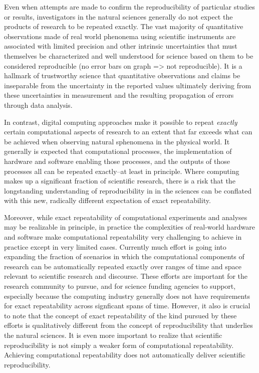 Even when attempts are made to confirm the reproducibility of particular studies or results, investigators in
	the natural sciences generally do not expect the products of research to be repeated exactly.
The vast majority of quantitative observations made of real world phenonema using scientific instruments
	are associated with limited precision and other intrinsic uncertainties that must themselves be characterized
	and well understood for science based on them to be considered reproducible (no error bars on graph => not
	reproducible).
It is a hallmark of trustworthy science that quantitative observations and claims be inseparable from the uncertainty
	in the reported values ultimately deriving from these uncertainties in measurement and the resulting
	propagation of errors through data analysis.

In contrast, digital computing approaches make it possible to repeat \emph{exactly} certain computational aspects of research
	to an extent that far exceeds what can be achieved when observing natural sphenomena in the physical world.  
It generally is expected that computational processes, the implementation of hardware and software 
	enabling those processes, and the outputs of those processes all can be repeated exactly--at least in principle.
Where computing makes up a significant fraction of scientific research, there is a risk that the longstanding
	understanding of reproducibility in in the sciences can be conflated with this new, radically different 
	expectation of exact repeatability. 

Moreover, while exact repeatability of computational experiments and analyses may be realizable in principle, 
	in practice the complexities of real-world hardware and software make computational repeatability 
	very challenging to achieve in practice except in very limited cases.
Currently much effort is going into expanding the fraction of scenarios in which the computational
	components of research can be automatically repeated exactly over ranges of time and space relevant to scientific 
	research and discourse.
These efforts are important for the research community to pursue, and for science funding
	agencies to support, especially because the computing industry generally does not have 
	requirements for exact repeatability across signficant spans of time.
However, it also is crucial to note that the concept of exact repeatability of the kind pursued by these efforts is 
	qualitatively different from the concept of reproducibility that underlies the natural sciences.
It is even more important to realize that scientific reproducibility is not simply a weaker form of computational
	repeatability.  
Achieving computational repeatability does not automatically deliver scientific reproducibility.


